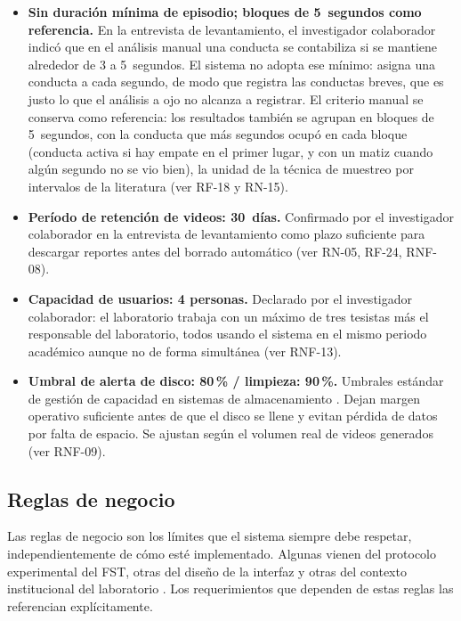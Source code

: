 \begin{itemize}
  \item \textbf{Sin duración mínima de episodio; bloques de 5~segundos como referencia.}
        En la entrevista de levantamiento, el investigador colaborador indicó que en
        el análisis manual una conducta se contabiliza si se mantiene alrededor de 3
        a 5~segundos. El sistema no adopta ese mínimo: asigna una conducta a cada
        segundo, de modo que registra las conductas breves, que es justo lo que el
        análisis a ojo no alcanza a registrar. El criterio manual se conserva como
        referencia: los resultados también se agrupan en bloques de 5~segundos, con la
        conducta que más segundos ocupó en cada bloque (conducta activa si hay empate
        en el primer lugar, y con un matiz cuando algún segundo no se vio bien), la
        unidad de la técnica de muestreo por intervalos de la literatura (ver RF-18 y
        RN-15).

  \item \textbf{Período de retención de videos: 30~días.}
        Confirmado por el investigador colaborador en la entrevista de levantamiento
        como plazo suficiente para descargar reportes antes del borrado automático
        (ver RN-05, RF-24, RNF-08).

  \item \textbf{Capacidad de usuarios: 4 personas.}
        Declarado por el investigador colaborador: el laboratorio trabaja con un
        máximo de tres tesistas más el responsable del laboratorio, todos usando
        el sistema en el mismo periodo académico aunque no de forma simultánea
        (ver RNF-13).

  \item \textbf{Umbral de alerta de disco: 80\,\% / limpieza: 90\,\%.}
        Umbrales estándar de gestión de capacidad en sistemas de almacenamiento
        \cite{pressman2014}. Dejan margen operativo suficiente antes de que el
        disco se llene y evitan pérdida de datos por falta de espacio. Se
        ajustan según el volumen real de videos generados (ver RNF-09).
\end{itemize}

\subsection{Reglas de negocio}

Las reglas de negocio son los límites que el sistema siempre debe respetar,
independientemente de cómo esté implementado. Algunas vienen del protocolo
experimental del FST, otras del diseño de la interfaz y otras del contexto
institucional del laboratorio \cite{pressman2014}. Los requerimientos que dependen
de estas reglas las referencian explícitamente.

